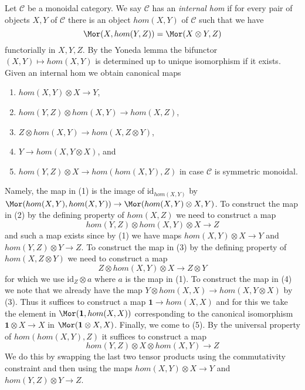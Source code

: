 \begin{remark}
\label{remark-internal-hom-monoidal}
Let $\mathcal{C}$ be a monoidal category. We say $\mathcal{C}$ has
an {\it internal hom} if for every pair of objects $X, Y$ of $\mathcal{C}$
there is an object $hom(X, Y)$ of $\mathcal{C}$ such that we have
$$
\Mor(X, hom(Y, Z)) = \Mor(X \otimes Y, Z)
$$
functorially in $X, Y, Z$. By the Yoneda lemma the bifunctor
$(X, Y) \mapsto hom(X, Y)$ is determined up to unique isomorphism
if it exists. Given an internal hom we obtain canonical maps
\begin{enumerate}
\item $hom(X, Y) \otimes X \to Y$,
\item $hom(Y, Z) \otimes hom(X, Y) \to hom(X, Z)$,
\item $Z \otimes hom(X, Y) \to hom(X, Z \otimes Y)$,
\item $Y \to hom(X, Y \otimes X)$, and
\item $hom(Y, Z) \otimes X \to hom(hom(X, Y), Z)$ in case
$\mathcal{C}$ is symmetric monoidal.
\end{enumerate}
Namely, the map in (1) is the image of $\text{id}_{hom(X, Y)}$
by $\Mor(hom(X, Y), hom(X, Y)) \to \Mor(hom(X, Y) \otimes X, Y)$.
To construct the map in (2) by the defining property of $hom(X, Z)$
we need to construct a map
$$
hom(Y, Z) \otimes hom(X, Y) \otimes X \longrightarrow Z
$$
and such a map exists since by (1) we have
maps $hom(X, Y) \otimes X \to Y$ and $hom(Y, Z) \otimes Y \to Z$.
To construct the map in (3) by the defining property of $hom(X, Z \otimes Y)$
we need to construct a map
$$
Z \otimes hom(X, Y) \otimes X \to Z \otimes Y
$$
for which we use $\text{id}_Z \otimes a$ where
$a$ is the map in (1). To construct the map in (4)
we note that we already have the map
$Y \otimes hom(X, X) \to hom(X, Y \otimes X)$ by (3).
Thus it suffices to construct a map $\mathbf{1} \to hom(X, X)$
and for this we take the element in $\Mor(\mathbf{1}, hom(X, X))$
corresponding to the canonical isomorphism $\mathbf{1} \otimes X \to X$
in $\Mor(\mathbf{1} \otimes X, X)$.
Finally, we come to (5). By the universal property of
$hom(hom(X, Y), Z)$ it suffices to construct a map
$$
hom(Y, Z) \otimes X \otimes hom(X, Y) \longrightarrow Z
$$
We do this by swapping the last two tensor products using the
commutativity constraint and then using the maps
$hom(X, Y) \otimes X \to Y$ and $hom(Y, Z) \otimes Y \to Z$.
\end{remark}













